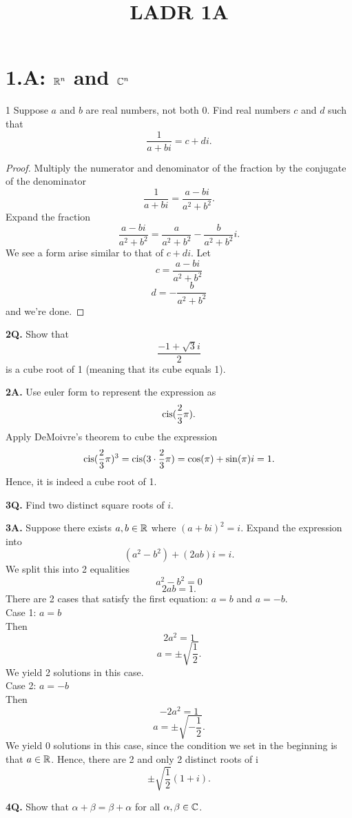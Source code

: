 \documentclass[12pt, letterpaper]{article}
\title{LADR 1A}
\begin{document}
\maketitle

\section*{1.A: $\mathbb{R}^n$ and $\mathbb{C}^n$}

\begin{problem}{1}
Suppose $a$ and $b$ are real numbers, not both 0. Find real numbers $c$ and
$d$ such that
$${\frac{1}{a+bi}}=c+di.$$
\end{problem}

\begin{proof}
Multiply the numerator and denominator of the fraction by the conjugate of the denominator
$$\frac{1}{a+bi} = \frac{a-bi}{a^2+b^2}.$$
Expand the fraction
$$\frac{a-bi}{a^2+b^2} = \frac{a}{a^2+b^2} - \frac{b}{a^2+b^2}i.$$
We see a form arise similar to that of ${c+di}$. Let
$$c = \frac{a-bi}{a^2+b^2}$$
$$d = -\frac{b}{a^2+b^2}$$
and we're done.
\end{proof}

\textbf{2Q.} 
Show that
$$\frac{-1+\sqrt{3}i}{2}$$
is a cube root of 1 (meaning that its cube equals 1).

\textbf{2A.} 
Use euler form to represent the expression as
$$\operatorname{cis}(\frac{2}{3}\pi).$$
Apply DeMoivre's theorem to cube the expression
$$\operatorname{cis}(\frac{2}{3}\pi)^3 = \operatorname{cis}(3\cdot\frac{2}{3}\pi) = \cos(\pi) + \sin(\pi)i = 1.$$
Hence, it is indeed a cube root of 1.

\textbf{3Q.} 
Find two distinct square roots of $i$.

\textbf{3A.} 
Suppose there exists $a,b\in\mathbb{R}$ where $(a+bi)^2 = i$. Expand the expression into
$$(a^2-b^2)+(2ab)i = i.$$
We split this into 2 equalities
$$a^2-b^2=0$$
$$2ab = 1.$$
There are 2 cases that satisfy the first equation: $a = b$ and $a = -b$.
\\Case 1: $a=b$
\\Then
$$2a^2 = 1$$
$$a = \pm\sqrt{\frac{1}{2}}.$$
We yield 2 solutions in this case.
\\Case 2: $a=-b$
\\Then
$$-2a^2 = 1$$
$$a = \pm\sqrt{-\frac{1}{2}}.$$
We yield 0 solutions in this case, since the condition we set in the beginning is that $a\in\mathbb{R}$.
Hence, there are 2 and only 2 distinct roots of i
$$\pm\sqrt{\frac{1}{2}}(1+i).$$

\textbf{4Q.}
Show that $\alpha + \beta = \beta + \alpha$ for all $\alpha,\beta\in\mathbb{C}$.
\end{document}
